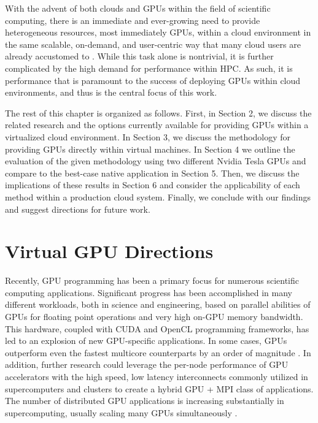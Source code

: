 With the advent of both clouds and GPUs within the field of scientific computing, there is an immediate and ever-growing need to provide heterogeneous resources, most immediately GPUs, within a cloud environment in the same scalable, on-demand, and user-centric way that many cloud users are already accustomed to \cite{crago2011heterogeneous}.  While this task alone is nontrivial, it is further complicated by the high demand for performance within HPC.  As such, it is performance that is paramount to the success of deploying GPUs within cloud environments, and thus is the central focus of this work.


The rest of this chapter is organized as follows.  First, in Section 2, we discuss the related research and the options currently available for providing GPUs within a virtualized cloud environment.  In Section 3, we discuss the methodology for providing GPUs directly within virtual machines.  In Section 4 we outline the evaluation of the given methodology using two different Nvidia Tesla GPUs and compare to the best-case native application in Section 5. Then, we discuss the implications of these results in Section 6 and consider the applicability of each method within a production cloud system.  Finally, we conclude with our findings and suggest directions for future work.


\section{Virtual GPU Directions}

Recently, GPU programming has been a primary focus for numerous scientific computing applications. Significant progress has been accomplished in many different workloads, both in science and engineering, based on parallel abilities of GPUs for floating point operations and very high on-GPU memory bandwidth. This hardware, coupled with CUDA and OpenCL programming frameworks, has led to an explosion of new GPU-specific applications. In some cases,  GPUs outperform even the fastest multicore counterparts by an order of magnitude \cite{sanders2010cuda}.  In addition, further research could leverage the per-node performance of GPU accelerators with the high speed, low latency interconnects commonly utilized in supercomputers and clusters  to create a hybrid GPU + MPI class of applications. The number of distributed GPU applications is increasing substantially in supercomputing, usually scaling many GPUs simultaneously \cite{kindratenko2009gpu}. 

